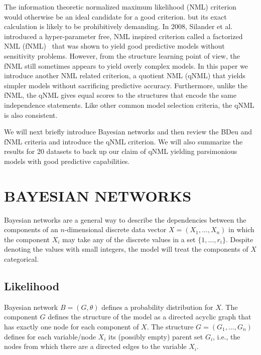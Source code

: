 \documentclass[letterpaper]{article}
\begin{document}
The information theoretic normalized maximum likelihood (NML)
criterion~\cite{Shta87,Riss96a} would otherwise be an ideal candidate
for a good criterion.  but its exact calculation is likely to be
prohibitively demanding. In 2008, Silander et al. introduced a
hyper-parameter free, NML inspired criterion called a factorized NML
(fNML)~\cite{cosco.pgm08a} that was shown to yield good predictive
models without sensitivity problems.  However, from the structure
learning point of view, the fNML still sometimes appears to yield
overly complex models. In this paper we introduce another NML related
criterion, a quotient NML (qNML) that yields simpler models without
sacrificing predictive accuracy. Furthermore, unlike the fNML, the
qNML gives equal scores to the structures that encode the same
independence statements. Like other common model selection criteria,
the qNML is also consistent.

We will next briefly introduce Bayesian networks and then review the
BDeu and fNML criteria and introduce the qNML criterion.  We will also
summarize the results for 20 datasets to back up our claim of qNML
yielding parsimonious models with good predictive capabilities.

\section{BAYESIAN NETWORKS}
\label{sec:bns}

Bayesian networks are a general way to describe the dependencies
between the components of an $n$\nobreakdash-dimensional discrete data
vector $X=(X_{1},\ldots,X_{n})$ in which the component $X_{i}$ may
take any of the discrete values in a set $\{1,\ldots,r_{i}\}$.
Despite denoting the values with small integers, the model will treat
the components of $X$ categorical.


\subsection{Likelihood}
\label{ssec:likelihood}

Bayesian network $B=(G,\theta)$ defines a probability distribution for
$X$. The component $G$ defines the structure of the model as a
directed acyclic graph that has exactly one node for each component of
$X$. The structure $G=(G_{1},\ldots,G_{n})$ defines for each
variable/node $X_{i}$ its (possibly empty) parent set $G_{i}$, i.e.,
the nodes from which there are a directed edges to the variable
$X_{i}$.
\end{document}
